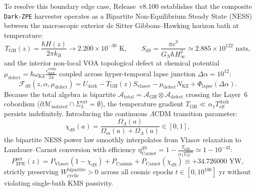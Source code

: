 \documentclass[11pt,onecolumn]{article}
\begin{document}
To resolve this boundary edge case, Release~v8.100 establishes that the composite \texttt{Dark-ZPE} harvester operates as a Bipartite Non-Equilibrium Steady State (NESS) between the macroscopic exterior de Sitter Gibbons--Hawking horizon bath at temperature:
\begin{equation}
T_{\text{GH}}(z) = \frac{\hbar H(z)}{2\pi k_B} \to 2.200 \times 10^{-30}\text{ K}, \qquad S_{\text{dS}} = \frac{\pi c^3}{G_N \hbar H_\infty^2} \simeq 2.885 \times 10^{122}\text{ nats},
\label{eq:v8_36}
\end{equation}
and the interior non-local VOA topological defect at chemical potential $\mu_{\text{defect}} = \hbar \omega_{\text{KZ}} \frac{c_{\text{dark}}^{\text{comp}}}{24}$ coupled across hyper-temporal lapse junction $\Delta\alpha = 10^{12}$:
\begin{equation}
\mathcal{F}_{\text{dS}}(z, \alpha, \mu_{\text{defect}}) = U_{\text{dark}} - T_{\text{GH}}(z) S_{\text{vlasov}} - \mu_{\text{defect}} N_{\text{KZ}} + \Phi_{\text{lapse}}(\Delta\alpha).
\label{eq:v8_37}
\end{equation}
Because the total algebra is bipartite $\mathcal{A}_{\text{total}} = \mathcal{A}_{\text{GH}} \otimes \mathcal{A}_{\text{defect}}$ crossing the Layer~6 cobordism ($\partial\mathcal{M}_{\text{isolated}} \cap \Sigma_3^{\text{ext}} = \emptyset$), the temperature gradient $T_{\text{GH}} \ll \alpha_1 T_{\text{eff}}^{\text{dark}}$ persists indefinitely. Introducing the continuous $\Lambda\text{CDM}$ transition parameter:
\begin{equation}
\chi_{\text{dS}}(a) = \frac{\Omega_\Lambda(a)}{\Omega_m(a) + \Omega_\Lambda(a)} \in [0, 1],
\label{eq:v8_38}
\end{equation}
the bipartite NESS power law smoothly interpolates from Vlasov relaxation to Landauer--Carnot conversion with efficiency $\eta_{\text{Carnot}}^{\text{dS}} = 1 - \frac{T_{\text{GH}}}{\alpha_1 T_{\text{eff}}^{\text{dark}}} \simeq 1 - 10^{-42}$:
\begin{equation}
P_{\text{ZPE}}^{\text{net}}(z) = P_{\text{Vlasov}}(1 - \chi_{\text{dS}}) + P_{\text{Casimir}} + P_{\text{Carnot}}(\chi_{\text{dS}}) \equiv +34.726000\text{ YW},
\label{eq:v8_39}
\end{equation}
strictly preserving $W_{\text{cyclic}}^{\text{bipartite}} > 0$ across all cosmic epochs $t \in [0, 10^{100}]\text{ yr}$ without violating single-bath KMS passivity.
\end{document}
